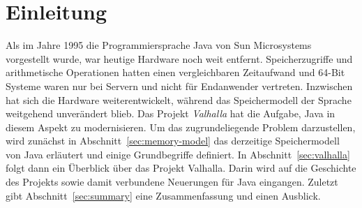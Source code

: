 \section{Einleitung}\label{sec:introduction}

Als im Jahre 1995 die Programmiersprache Java von Sun Microsystems vorgestellt wurde, war heutige Hardware noch weit entfernt.
Speicherzugriffe und arithmetische Operationen hatten einen vergleichbaren Zeitaufwand und 64-Bit Systeme waren nur bei Servern und nicht für Endanwender vertreten.
Inzwischen hat sich die Hardware weiterentwickelt, während das Speichermodell der Sprache weitgehend unverändert blieb.
Das Projekt \emph{Valhalla} hat die Aufgabe, Java in diesem Aspekt zu modernisieren.
Um das zugrundeliegende Problem darzustellen, wird zunächst in Abschnitt~\ref{sec:memory-model} das derzeitige Speichermodell von Java erläutert und einige Grundbegriffe definiert.
In Abschnitt~\ref{sec:valhalla} folgt dann ein Überblick über das Projekt Valhalla.
Darin wird auf die Geschichte des Projekts sowie damit verbundene Neuerungen für Java eingangen.
Zuletzt gibt Abschnitt~\ref{sec:summary} eine Zusammenfassung und einen Ausblick.
